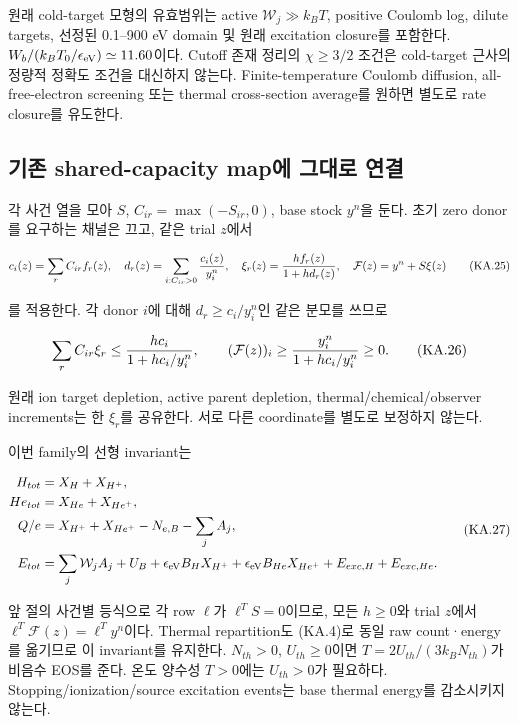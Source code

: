 원래 cold-target 모형의 유효범위는 active \(\mathcal W_j\gg k_BT\), positive Coulomb log, dilute targets, 선정된 0.1--900 eV domain 및 원래 excitation closure를 포함한다. \(W_b/(k_BT_0/\epsilon_{\rm eV})\simeq11.60\)이다. Cutoff 존재 정리의 \(\chi\ge3/2\) 조건은 cold-target 근사의 정량적 정확도 조건을 대신하지 않는다. Finite-temperature Coulomb diffusion, all-free-electron screening 또는 thermal cross-section average를 원하면 별도로 rate closure를 유도한다.

\hypertarget{uxae30uxc874-shared-capacity-mapuxc5d0-uxadf8uxb300uxb85c-uxc5f0uxacb0}{%
\subsection{기존 shared-capacity map에 그대로 연결}\label{uxae30uxc874-shared-capacity-mapuxc5d0-uxadf8uxb300uxb85c-uxc5f0uxacb0}}

각 사건 열을 모아 \(S\), \(C_{ir}=\max(-S_{ir},0)\), base stock \(y^n\)을 둔다. 초기 zero donor를 요구하는 채널은 끄고, 같은 trial \(z\)에서

\[
 c_i(z)=\sum_r C_{ir}f_r(z),\quad
 d_r(z)=\sum_{i:C_{ir}>0}{c_i(z)\over y_i^n},\quad
 \xi_r(z)={h f_r(z)\over1+h d_r(z)},\quad
 \mathcal F(z)=y^n+S\xi(z)
 \tag{KA.25}
\]

를 적용한다. 각 donor \(i\)에 대해 \(d_r\ge c_i/y_i^n\)인 같은 분모를 쓰므로

\[
 \sum_rC_{ir}\xi_r\le {h c_i\over1+h c_i/y_i^n},\qquad
 (\mathcal F(z))_i\ge{y_i^n\over1+h c_i/y_i^n}\ge0.
 \tag{KA.26}
\]

원래 ion target depletion, active parent depletion, thermal/chemical/observer increments는 한 \(\xi_r\)를 공유한다. 서로 다른 coordinate를 별도로 보정하지 않는다.

이번 family의 선형 invariant는

\[
 \begin{aligned}
 H_{tot}&=X_H+X_{H^+},\\
 He_{tot}&=X_{He}+X_{He^+},\\
 Q/e&=X_{H^+}+X_{He^+}-N_{e,B}-\sum_jA_j,\\
 E_{tot}&=\sum_j\mathcal W_jA_j+U_B+\epsilon_{\rm eV}B_HX_{H^+}
                     +\epsilon_{\rm eV}B_{He}X_{He^+}+E_{exc,H}+E_{exc,He}.
 \end{aligned}\tag{KA.27}
\]

앞 절의 사건별 등식으로 각 row \(\ell\)가 \(\ell^TS=0\)이므로, 모든 \(h\ge0\)와 trial \(z\)에서 \(\ell^T\mathcal F(z)=\ell^Ty^n\)이다. Thermal repartition도 (KA.4)로 동일 raw count·energy를 옮기므로 이 invariant를 유지한다. \(N_{th}>0\), \(U_{th}\ge0\)이면 \(T=2U_{th}/(3k_BN_{th})\)가 비음수 EOS를 준다. 온도 양수성 \(T>0\)에는 \(U_{th}>0\)가 필요하다. Stopping/ionization/source excitation events는 base thermal energy를 감소시키지 않는다.

